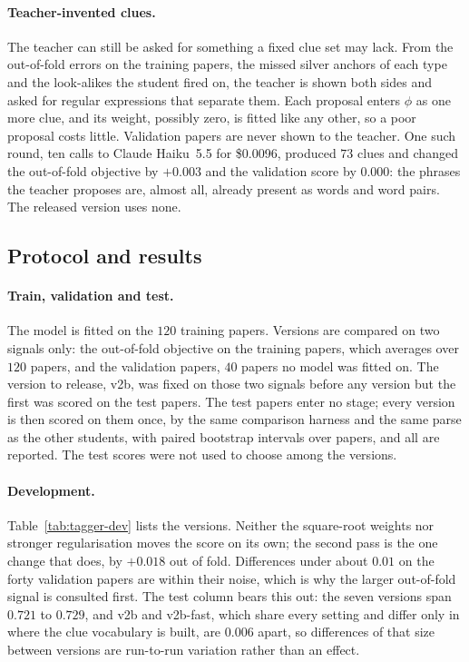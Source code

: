 \documentclass[10pt]{article}
\begin{document}
\paragraph{Teacher-invented clues.}
The teacher can still be asked for something a fixed clue set may lack. From the out-of-fold errors on the training papers, the missed silver anchors of each type and the look-alikes the student fired on, the teacher is shown both sides and asked for regular expressions that separate them. Each proposal enters $\phi$ as one more clue, and its weight, possibly zero, is fitted like any other, so a poor proposal costs little. Validation papers are never shown to the teacher. One such round, ten calls to Claude Haiku~5.5 for \$0.0096, produced $73$ clues and changed the out-of-fold objective by $+0.003$ and the validation score by $0.000$: the phrases the teacher proposes are, almost all, already present as words and word pairs. The released version uses none.

\FloatBarrier
\subsection{Protocol and results}

\paragraph{Train, validation and test.}
The model is fitted on the $120$ training papers. Versions are compared on two signals only: the out-of-fold objective on the training papers, which averages over $120$ papers, and the validation papers, $40$ papers no model was fitted on. The version to release, v2b, was fixed on those two signals before any version but the first was scored on the test papers. The test papers enter no stage; every version is then scored on them once, by the same comparison harness and the same parse as the other students, with paired bootstrap intervals over papers, and all are reported. The test scores were not used to choose among the versions.

\paragraph{Development.}
Table~\ref{tab:tagger-dev} lists the versions. Neither the square-root weights nor stronger regularisation moves the score on its own; the second pass is the one change that does, by $+0.018$ out of fold. Differences under about $0.01$ on the forty validation papers are within their noise, which is why the larger out-of-fold signal is consulted first. The test column bears this out: the seven versions span $0.721$ to $0.729$, and v2b and v2b-fast, which share every setting and differ only in where the clue vocabulary is built, are $0.006$ apart, so differences of that size between versions are run-to-run variation rather than an effect.
\end{document}
